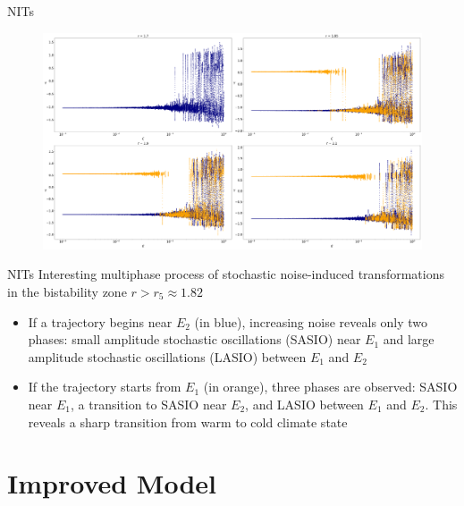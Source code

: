 \documentclass[10pt]{beamer}
\begin{document}
\begin{frame}{NITs}
	\begin{figure}
	\includegraphics[width=\textwidth, height=\textheight,keepaspectratio]{figures_2/NITvseps1.png}
	\end{figure}
\end{frame}

\begin{frame}{NITs}
	Interesting multiphase process of stochastic noise-induced transformations
	in the bistability zone $r > r_5\approx 1.82$
	\begin{itemize}
		\item If a trajectory begins near 
		$E_2$ (in blue), increasing noise reveals only two phases: small 
		amplitude stochastic oscillations (SASIO) near $E_1$ and large amplitude 
		stochastic oscillations (LASIO) between $E_1$ and $E_2$
		\item If the trajectory starts from $E_1$ (in orange), three phases are 
		observed: SASIO near $E_1$, a transition to SASIO near $E_2$, and LASIO 
		between $E_1$ and $E_2$. This reveals a sharp transition from warm to cold 
		climate state
	\end{itemize}
\end{frame}


\section{Improved Model}
\end{document}
